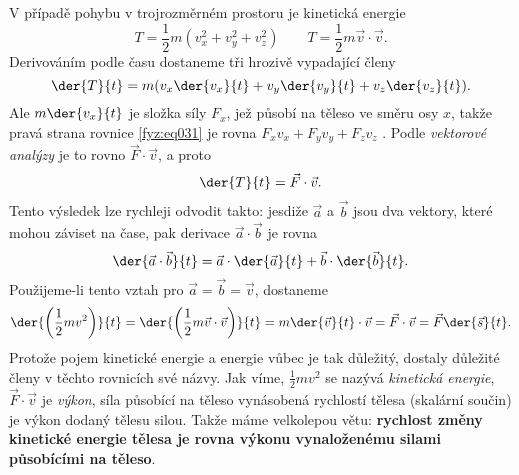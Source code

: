     V případě pohybu v trojrozměrném prostoru je kinetická energie
    \begin{equation}\label{fyz:eq030}
      T = \frac{1}{2}m(v_x^2 + v_y^2 + v_z^2) \quad\quad 
      T = \frac{1}{2}m\vec{v}\cdot\vec{v}.
    \end{equation}
    Derivováním podle času dostaneme tři hrozivě vypadající členy
    \begin{equation}\label{fyz:eq031}
      \der{T}{t} = m(v_x\der{v_x}{t} + v_y\der{v_y}{t} + v_z\der{v_z}{t}).
    \end{equation}
    Ale \(m\der{v_x}{t}\) je složka síly \(F_x\), jež působí na těleso ve směru osy \(x\), takže 
    pravá strana rovnice \ref{fyz:eq031} je rovna \(F_xv_x + F_yv_y + F_zv_z\) . Podle 
    \emph{vektorové analýzy} je to rovno \(\vec{F}\cdot\vec{v}\), a proto
    \begin{equation}\label{fyz:eq032}
      \der{T}{t} = \vec{F}\cdot\vec{v}.
    \end{equation}
    Tento výsledek lze rychleji odvodit takto: jesdiže \(\vec{a}\) a \(\vec{b}\) jsou dva vektory, 
    které mohou záviset na čase, pak derivace \(\vec{a}\cdot\vec{b}\) je rovna
    \begin{equation}\label{fyz:eq033}
      \der{\vec{a}\cdot\vec{b}}{t} = \vec{a}\cdot\der{\vec{a}}{t} + \vec{b}\cdot\der{\vec{b}}{t}.
    \end{equation}
    Použijeme-li tento vztah pro \(\vec{a}=\vec{b}=\vec{v}\), dostaneme
    \begin{equation}\label{fyz:eq034}
      \der{\left(\frac{1}{2}mv^2\right)}{t} = 
      \der{\left(\frac{1}{2}m\vec{v}\cdot\vec{v}\right)}{t} = 
      m\der{\vec{v}}{t}\cdot\vec{v} = 
      \vec{F}\cdot\vec{v} = 
      \vec{F}\der{\vec{s}}{t}.
    \end{equation}
    Protože pojem kinetické energie a energie vůbec je tak důležitý, dostaly důležité členy v 
    těchto rovnicích své názvy. Jak víme, \(\frac{1}{2}mv^2\) se nazývá \emph{kinetická energie}, 
    \(\vec{F}\cdot\vec{v}\) je \emph{výkon}, síla působící na těleso vynásobená rychlostí tělesa 
    (skalární součin) je výkon dodaný tělesu silou. Takže máme velkolepou větu: \textbf{rychlost 
    změny kinetické energie tělesa je rovna výkonu vynaloženému silami působícími na těleso}.
    
